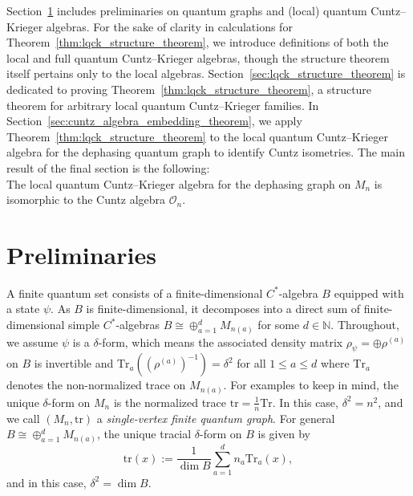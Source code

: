 \documentclass[11pt]{article}
\theoremstyle{plain}
\theoremstyle{nonumberplain}
\theoremstyle{plain}
\theoremstyle{nonumberplain}
\newcommand\1{{\bf 1}}
\newcommand\bN{{\mathbb N}}
\newcommand\cO{{\mathcal O}}
\newcommand{\Tr}{\text{Tr}} %
\newcommand{\tr}{\text{tr}} %
\newcommand{\<}{\left\langle}
\renewcommand{\>}{\right\rangle}
\begin{document}
Section~\ref{sec:preliminaries} includes preliminaries on quantum graphs and (local) quantum Cuntz--Krieger algebras. For the sake of clarity in calculations for Theorem~\ref{thm:lqck_structure_theorem}, we introduce definitions of both the local and full quantum Cuntz--Krieger algebras, though the structure theorem itself pertains only to the local algebras. Section~\ref{sec:lqck_structure_theorem} is dedicated to proving Theorem~\ref{thm:lqck_structure_theorem}, a structure theorem for arbitrary local quantum Cuntz--Krieger families. In Section~\ref{sec:cuntz_algebra_embedding_theorem}, we apply Theorem~\ref{thm:lqck_structure_theorem} to the local quantum Cuntz--Krieger algebra for the dephasing quantum graph to identify Cuntz isometries. The main result of the final section is the following:\\

 The local quantum Cuntz--Krieger algebra for the dephasing graph on $M_n$ is isomorphic to the Cuntz algebra $\cO_n$.
 
\section{Preliminaries}\label{sec:preliminaries}

A finite quantum set consists of a finite-dimensional $C^*$-algebra $B$ equipped with a state $\psi$. As $B$ is finite-dimensional, it decomposes into a direct sum of finite-dimensional simple $C^*$-algebras $B\cong \oplus_{a=1}^d M_{n(a)}$ for some $d\in \bN$. Throughout, we assume $\psi$ is a $\delta$-form, which means the associated density matrix $\rho_\psi = \oplus \rho^{(a)}$ on $B$ is invertible and $\Tr_a((\rho^{(a)})^{-1}) = \delta^2$ for all $1\leq a \leq d$ where $\Tr_a$ denotes the non-normalized trace on $M_{n(a)}$. 
For examples to keep in mind, the unique $\delta$-form on $M_n$ is the normalized trace $\tr=\frac{1}{n}\Tr$. In this case, $\delta^2 = n^2$, and we call $(M_n,\tr)$ a {\em single-vertex finite quantum graph}.
 For general $B\cong \oplus_{a=1}^d M_{n(a)}$, the unique tracial $\delta$-form on $B$ is given by 
    \[
    \tr(x):= \frac{1}{\dim{B}}\sum_{a=1}^d n_a \Tr_a(x),
    \]
    and in this case, $\delta^2 = \dim{B}$.
\end{document}
